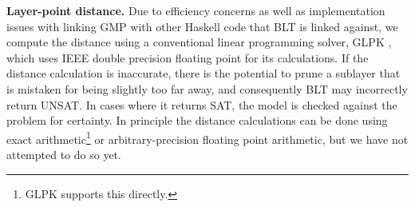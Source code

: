 
\textbf{Layer-point distance.}
%
Due to efficiency concerns as well as implementation issues with linking
GMP with other Haskell code that BLT is linked against,
we compute the distance using a conventional linear programming solver,
GLPK \cite{GLPK}, which uses IEEE double precision floating point for
its calculations.  If the distance calculation is inaccurate, there is the
potential to prune a sublayer that is mistaken for being slightly too far
away,
and consequently BLT may incorrectly return UNSAT.  In cases where it
returns SAT, the model is checked against the problem for certainty. In
principle the distance calculations can be done using exact
arithmetic\footnote{GLPK supports this directly.} or arbitrary-precision
floating point arithmetic, but we have not attempted to do so yet.
